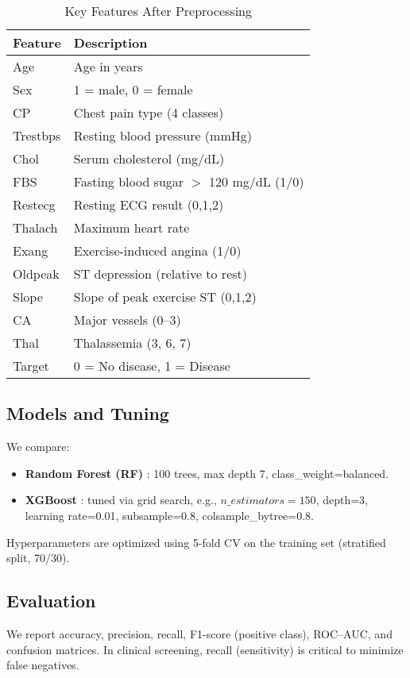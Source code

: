 \documentclass[conference]{IEEEtran}
\begin{document}
\begin{table}[!t]
\centering
\caption{Key Features After Preprocessing}
\label{tab:features}
\begin{tabular}{@{}ll@{}}
\toprule
\textbf{Feature} & \textbf{Description} \\
\midrule
Age & Age in years \\
Sex & 1 = male, 0 = female \\
CP & Chest pain type (4 classes) \\
Trestbps & Resting blood pressure (mmHg) \\
Chol & Serum cholesterol (mg/dL) \\
FBS & Fasting blood sugar $>$ 120 mg/dL (1/0) \\
Restecg & Resting ECG result (0,1,2) \\
Thalach & Maximum heart rate \\
Exang & Exercise-induced angina (1/0) \\
Oldpeak & ST depression (relative to rest) \\
Slope & Slope of peak exercise ST (0,1,2) \\
CA & Major vessels (0--3) \\
Thal & Thalassemia (3, 6, 7) \\
Target & 0 = No disease, 1 = Disease \\
\bottomrule
\end{tabular}
\end{table}

\subsection{Models and Tuning}
We compare:
\begin{itemize}
\item \textbf{Random Forest (RF)} \cite{breiman2001rf}: 100 trees, max depth 7, class\_weight=balanced.
\item \textbf{XGBoost} \cite{chen2016xgb}: tuned via grid search, e.g., \(n\_estimators=150\), depth=3, learning rate=0.01, subsample=0.8, colsample\_bytree=0.8.
\end{itemize}
Hyperparameters are optimized using 5-fold CV on the training set (stratified split, 70/30).

\subsection{Evaluation}
We report accuracy, precision, recall, F1-score (positive class), ROC--AUC, and confusion matrices. In clinical screening, recall (sensitivity) is critical to minimize false negatives.
\end{document}

